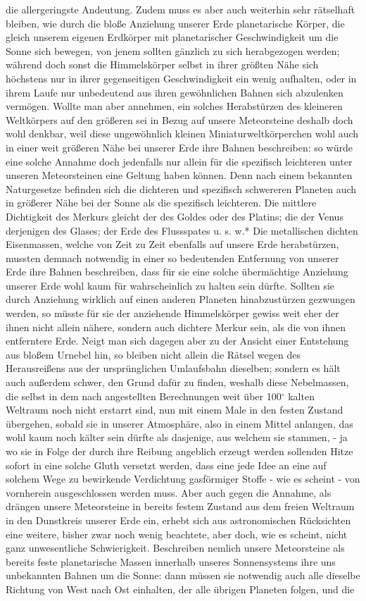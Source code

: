 \documentclass[a4paper, 11pt, oneside, polutonikogreek, german]{article}
\begin{document}
die allergeringste Andeutung. Zudem muss es aber auch weiterhin sehr rätselhaft bleiben, wie durch die bloße Anziehung unserer Erde planetarische Körper, die gleich unserem eigenen Erdkörper mit planetarischer Geschwindigkeit um die Sonne sich bewegen, von jenem sollten gänzlich zu sich herabgezogen werden; während doch sonst die Himmelskörper selbst in ihrer größten Nähe sich höchstens nur in ihrer gegenseitigen Geschwindigkeit ein wenig aufhalten, oder in ihrem Laufe nur unbedeutend aus ihren gewöhnlichen Bahnen sich abzulenken vermögen. Wollte man aber annehmen, ein solches Herabstürzen des kleineren Weltkörpers auf den größeren sei in Bezug auf unsere Meteorsteine deshalb doch wohl denkbar, weil diese ungewöhnlich kleinen Miniaturweltkörperchen wohl auch in einer weit größeren Nähe bei unserer Erde ihre Bahnen beschreiben: so würde eine solche Annahme doch jedenfalls nur allein für die spezifisch leichteren unter unseren Meteorsteinen eine Geltung haben können. Denn nach einem bekannten Naturgesetze befinden sich die dichteren und spezifisch schwereren Planeten auch in größerer Nähe bei der Sonne als die spezifisch leichteren. Die mittlere Dichtigkeit des Merkurs gleicht der des Goldes oder des Platins; die der Venus derjenigen des Glases; der Erde des Flussspates u. s. w.* Die metallischen dichten Eisenmassen, welche von Zeit zu Zeit ebenfalls auf unsere Erde herabstürzen, mussten demnach notwendig in einer so bedeutenden Entfernung von unserer Erde ihre Bahnen beschreiben, dass für sie eine solche übermächtige Anziehung unserer Erde wohl kaum für wahrscheinlich zu halten sein dürfte. Sollten sie durch Anziehung wirklich auf einen anderen Planeten hinabzustürzen gezwungen werden, so müsste für sie der anziehende Himmelskörper gewiss weit eher der ihnen nicht allein nähere, sondern auch dichtere Merkur sein, als die von ihnen entferntere Erde. Neigt man sich dagegen aber zu der Ansicht einer Entstehung aus bloßem Urnebel hin, so bleiben nicht allein die Rätsel wegen des Herausreißens aus der ursprünglichen Umlaufsbahn dieselben; sondern es hält auch außerdem schwer, den Grund dafür zu finden, weshalb diese Nebelmassen, die selbst in dem nach angestellten Berechnungen weit über 100$^\circ$ kalten Weltraum noch nicht erstarrt sind, nun mit einem Male in den festen Zustand übergehen, sobald sie in unserer Atmosphäre, also in einem Mittel anlangen, das wohl kaum noch kälter sein dürfte als dasjenige, aus welchem sie stammen, - ja wo sie in Folge der durch ihre Reibung angeblich erzeugt werden sollenden Hitze sofort in eine solche Gluth versetzt werden, dass eine jede Idee an eine auf solchem Wege zu bewirkende Verdichtung gasförmiger Stoffe - wie es scheint - von vornherein ausgeschlossen werden muss. Aber auch gegen die Annahme, als drängen unsere Meteorsteine in bereits festem Zustand aus dem freien Weltraum in den Dunstkreis unserer Erde ein, erhebt sich aus astronomischen Rücksichten eine weitere, bisher zwar noch wenig beachtete, aber doch, wie es scheint, nicht ganz unwesentliche Schwierigkeit. Beschreiben nemlich unsere Meteorsteine als bereits feste planetarische Massen innerhalb unseres Sonnensystems ihre uns unbekannten Bahnen um die Sonne: dann müssen sie notwendig auch alle dieselbe Richtung von West nach Ost einhalten, der alle übrigen Planeten folgen, und die 
\end{document}
